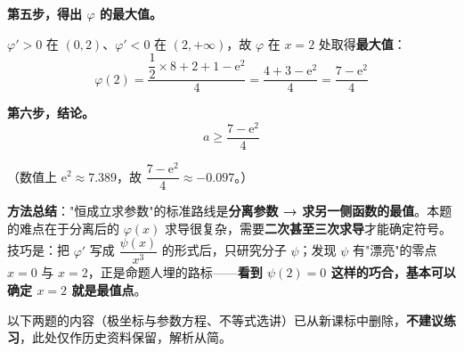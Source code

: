 \begin{answer}
\textbf{第五步，得出 $\varphi$ 的最大值。}

$\varphi'>0$ 在 $(0,2)$、$\varphi'<0$ 在 $(2,+\infty)$，故 $\varphi$ 在 $x=2$ 处取得\textbf{最大值}：
\nopagebreak[4]
\[\varphi(2)=\frac{\dfrac12\times8+2+1-\mathrm e^{2}}{4}=\frac{4+3-\mathrm e^{2}}4=\frac{7-\mathrm e^{2}}4\]

\textbf{第六步，结论。}
\nopagebreak[4]
\[a\ge\frac{7-\mathrm e^{2}}4\]

（数值上 $\mathrm e^{2}\approx7.389$，故 $\dfrac{7-\mathrm e^{2}}4\approx-0.097$。）

\begin{gktip}
\textbf{方法总结}："恒成立求参数"的标准路线是\textbf{分离参数 → 求另一侧函数的最值}。本题的难点在于分离后的 $\varphi(x)$ 求导很复杂，需要\textbf{二次甚至三次求导}才能确定符号。技巧是：把 $\varphi'$ 写成 $\dfrac{\psi(x)}{x^{3}}$ 的形式后，只研究分子 $\psi$；发现 $\psi$ 有"漂亮"的零点 $x=0$ 与 $x=2$，正是命题人埋的路标——\textbf{看到 $\psi(2)=0$ 这样的巧合，基本可以确定 $x=2$ 就是最值点}。
\end{gktip}



\par\medskip

\end{answer}

\begin{gktip}
以下两题的内容（极坐标与参数方程、不等式选讲）已从新课标中删除，\textbf{不建议练习}，此处仅作历史资料保留，解析从简。
\end{gktip}

